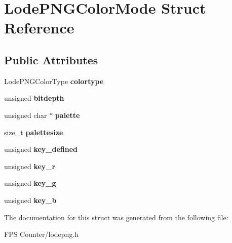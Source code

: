 \hypertarget{struct_lode_p_n_g_color_mode}{}\section{Lode\+P\+N\+G\+Color\+Mode Struct Reference}
\label{struct_lode_p_n_g_color_mode}
\subsection*{Public Attributes}
\begin{DoxyCompactItemize}
\item 
\mbox{\label{struct_lode_p_n_g_color_mode_a4f3df7240411abe80546052d197fbe8d}} 
Lode\+P\+N\+G\+Color\+Type {\bfseries colortype}
\item 
\mbox{\label{struct_lode_p_n_g_color_mode_ad20010b9561980f65281bc17f7848253}} 
unsigned {\bfseries bitdepth}
\item 
\mbox{\label{struct_lode_p_n_g_color_mode_a54f0a793238009fcb95f081626fae308}} 
unsigned char $\ast$ {\bfseries palette}
\item 
\mbox{\label{struct_lode_p_n_g_color_mode_a407557f056168682d9319aeb60866dcc}} 
size\+\_\+t {\bfseries palettesize}
\item 
\mbox{\label{struct_lode_p_n_g_color_mode_ab9105505c5d56cfc6ce4efe1bb288b54}} 
unsigned {\bfseries key\+\_\+defined}
\item 
\mbox{\label{struct_lode_p_n_g_color_mode_a29e64327bca1f3d16235e9ff471e4d50}} 
unsigned {\bfseries key\+\_\+r}
\item 
\mbox{\label{struct_lode_p_n_g_color_mode_ad98309f36d289392b0c440baa50af9f6}} 
unsigned {\bfseries key\+\_\+g}
\item 
\mbox{\label{struct_lode_p_n_g_color_mode_a93a269405fee0d1c5045a1a671ed1de8}} 
unsigned {\bfseries key\+\_\+b}
\end{DoxyCompactItemize}


The documentation for this struct was generated from the following file\+:\begin{DoxyCompactItemize}
\item 
F\+P\+S Counter/lodepng.\+h\end{DoxyCompactItemize}
